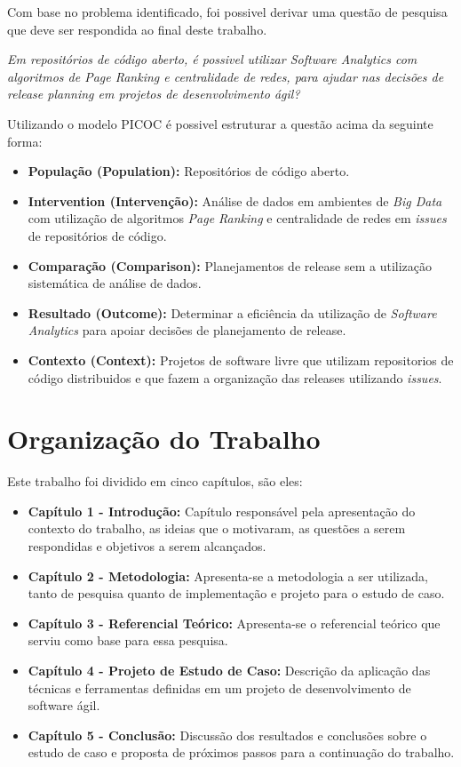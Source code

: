 Com base no problema identificado, foi possivel derivar uma questão de pesquisa
que deve ser respondida ao final deste trabalho.

\begin{center}
    \textit{Em repositórios de código aberto, é possivel utilizar Software Analytics
            com algoritmos de Page Ranking e centralidade de redes, para ajudar nas 
            decisões de release planning em projetos de desenvolvimento
            ágil?}
\end{center}

Utilizando o modelo PICOC é possivel estruturar a questão acima da seguinte forma:

\begin{itemize}
    \item \textbf{População (Population):} Repositórios de código aberto.
    \item \textbf{Intervention (Intervenção):} Análise de dados em ambientes de
        \textit{Big Data} com utilização de algoritmos \textit{Page Ranking} e
        centralidade de redes em \textit{issues} de repositórios de código.
    \item \textbf{Comparação (Comparison):} Planejamentos de release sem a utilização
        sistemática de análise de dados.
    \item \textbf{Resultado  (Outcome):} Determinar a eficiência da utilização de
        \textit{Software Analytics} para apoiar decisões de planejamento de release.
    \item \textbf{Contexto (Context):} Projetos de software livre que utilizam
        repositorios de código distribuidos e que fazem a organização das releases
        utilizando \textit{issues}.
\end{itemize}


\section{Organização do Trabalho}
Este trabalho foi dividido em cinco capítulos, são eles:

\begin{itemize}
    \item \textbf{Capítulo 1 - Introdução:} Capítulo responsável pela apresentação do contexto do trabalho, as ideias que o motivaram, as questões a serem respondidas e objetivos a serem alcançados.
    \item \textbf{Capítulo 2 - Metodologia:} Apresenta-se a metodologia a ser utilizada, tanto de pesquisa quanto de implementação e projeto para o estudo de caso.
    \item \textbf{Capítulo 3 - Referencial Teórico:} Apresenta-se o referencial teórico que serviu como base para essa pesquisa.
    \item \textbf{Capítulo 4 - Projeto de Estudo de Caso:} Descrição da aplicação das técnicas e ferramentas definidas em um projeto de desenvolvimento de software ágil.
    \item \textbf{Capítulo 5 - Conclusão:} Discussão dos resultados e conclusões sobre o estudo de caso e proposta de próximos passos para a continuação do trabalho.
\end{itemize}
